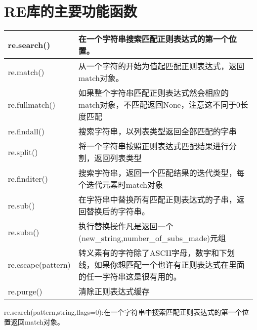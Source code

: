 \section{RE库的主要功能函数}
\begin{center}
\begin{tabular}{|p{3cm}|p{12cm}|}
\hline
re.search()&在一个字符串搜索匹配正则表达式的第一个位置。\\
\hline
re.match()&从一个字符的开始为值起匹配正则表达式，返回match对象。\\
\hline
re.fullmatch()&如果整个字符串匹配正则表达式然会相应的match对象，不匹配返回None，注意这不同于0长度匹配\\
\hline
re.findall()&搜索字符串，以列表类型返回全部匹配的字串\\
\hline
re.split()&将一个字符串按照正则表达式匹配结果进行分割，返回列表类型\\
\hline
re.finditer()&搜索字符串，返回一个匹配结果的迭代类型，每个迭代元素时match对象\\
\hline
re.sub()&在字符串中替换所有匹配正则表达式的子串，返回替换后的字符串。\\
\hline
re.subn()&执行替换操作凡是返回一个(new\_string,number\_of\_subs\_made)元组\\
\hline
re.escape(pattern)&转义素有的字符除了ASCII字母，数字和下划线，如果你想匹配一个也许有正则表达式在里面的任一字符串这是很有用的。\\
\hline
re.purge()&清除正则表达式缓存\\
\hline
\end{tabular}
\end{center}
re.search(pattern,string,flags=0):在一个字符串中搜索匹配正则表达式的第一个位置返回match对象。\newline
